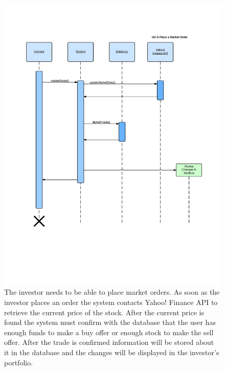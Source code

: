 \begin{figure}[H]
\centering
\includegraphics[width=5.5in]{./img/inter/uc5.jpg}
\caption
{The investor needs to be able to place market
orders. As soon as the investor places an order the system contacts Yahoo!
Finance API to retrieve the current price of the stock. After the current price
is found the system must confirm with the database that the user has enough funds
to make a buy offer or enough stock to make the sell offer. After the trade is
confirmed information will be stored about it in the database and the changes
will be displayed in the investor’s portfolio.}
\end{figure}



